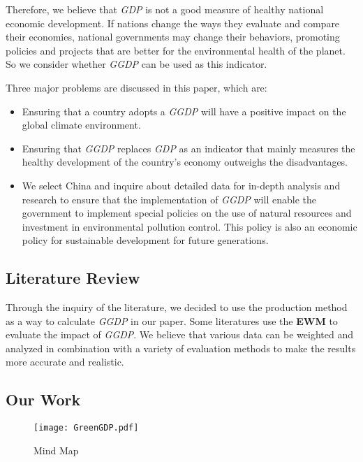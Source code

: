 \documentclass[12pt]{article}
\begin{document}
	Therefore, we believe that \textit{GDP} is not a good measure of healthy national economic development.
	If nations change the ways they evaluate and compare their economies, national governments may change their behaviors, promoting policies and projects that are better for the environmental health of the planet.
	So we consider whether \textit{GGDP} can be used as this indicator.
	
	Three major problems are discussed in this paper, which are:
	
	\begin{itemize}
		\item Ensuring that a country adopts a \textit{GGDP} will have a positive impact on the global climate environment.
		\item Ensuring that \textit{GGDP} replaces \textit{GDP} as an indicator that mainly measures the healthy development of the country's economy outweighs the disadvantages.
		\item We select China and inquire about detailed data for in-depth analysis and research to ensure that the implementation of \textit{GGDP} will enable the government to implement special policies on the use of natural resources and investment in environmental pollution control.
		This policy is also an economic policy for sustainable development for future generations.
	\end{itemize}
	
	\subsection{Literature Review} %
	Through the inquiry of the literature, we decided to use the production method as a way to calculate \textit{GGDP} in our paper.
	Some literatures use the \textbf{EWM} to evaluate the impact of \textit{GGDP}.
	We believe that various data can be weighted and analyzed in combination with a variety of evaluation methods to make the results more accurate and realistic.
	
	\newpage
	
	\subsection{Our Work} %
	
	\begin{figure}[!htbp]
		\centering
		\texttt{[image: GreenGDP.pdf]}
		\caption{Mind Map}\label{fig:mindmap}
	\end{figure}
\end{document}
